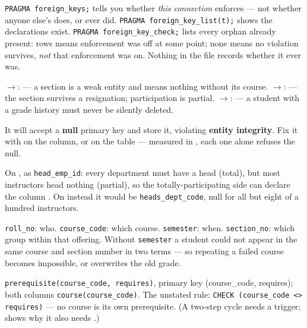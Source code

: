 \begin{ans}
  \item \texttt{PRAGMA foreign\_keys;} tells you whether \emph{this
        connection} enforces --- not whether anyone else's does, or ever did.
        \texttt{PRAGMA foreign\_key\_list(t);} shows the declarations exist.
        \texttt{PRAGMA foreign\_key\_check;} lists every orphan already
        present: rows means enforcement was off at some point; none means no
        violation survives, \emph{not} that enforcement was on. Nothing in the
        file records whether it ever was.
  \item {}$\rightarrow$:  --- a
        section is a weak entity and means nothing without its course.
        $\rightarrow$:  --- the
        section survives a resignation; participation is partial.
        $\rightarrow$:  --- a
        student with a grade history must never be silently deleted.
  \item It will accept a \textbf{null} primary key and store it, violating
        \textbf{entity integrity}. Fix it with  on the column,
        or  on the table --- measured in ,
        each one alone refuses the null.
\end{ans}

\begin{ans}
  \item On , as \texttt{head\_emp\_id}: every department must
        have a head (total), but most instructors head nothing (partial), so
        the totally-participating side can declare the column .
        On  instead it would be \texttt{heads\_dept\_code},
        null for all but eight of a hundred instructors.
  \item \texttt{roll\_no}: who. \texttt{course\_code}: which course.
        \texttt{semester}: when. \texttt{section\_no}: which group within that
        offering. Without \texttt{semester} a student could not appear in the
        same course and section number in two terms --- so repeating a failed
        course becomes impossible, or overwrites the old grade.
  \item \texttt{prerequisite(course\_code, requires)}, primary key (course\_code,
        requires); both columns  \texttt{course(course\_code)}.
        The unstated rule: \texttt{CHECK (course\_code <> requires)} --- no
        course is its own prerequisite. (A two-step cycle needs a trigger;
         shows why it also needs .)
\end{ans}

